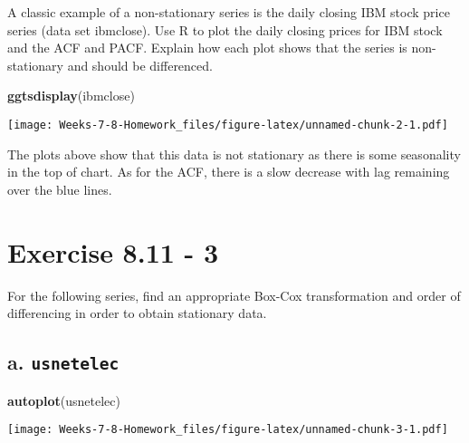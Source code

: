 \documentclass[]{article}
\newenvironment{Shaded}{\begin{snugshade}}{\end{snugshade}}
\newcommand{\KeywordTok}[1]{\textcolor[rgb]{0.13,0.29,0.53}{\textbf{#1}}}
\newcommand{\NormalTok}[1]{#1}
\newcommand{\OperatorTok}[1]{\textcolor[rgb]{0.81,0.36,0.00}{\textbf{#1}}}
\newcommand{\StringTok}[1]{\textcolor[rgb]{0.31,0.60,0.02}{#1}}
\begin{document}
A classic example of a non-stationary series is the daily closing IBM
stock price series (data set ibmclose). Use R to plot the daily closing
prices for IBM stock and the ACF and PACF. Explain how each plot shows
that the series is non-stationary and should be differenced.

\begin{Shaded}
\begin{Highlighting}[]
\KeywordTok{ggtsdisplay}\NormalTok{(ibmclose)}
\end{Highlighting}
\end{Shaded}

\texttt{[image: Weeks-7-8-Homework\_files/figure-latex/unnamed-chunk-2-1.pdf]}

The plots above show that this data is not stationary as there is some
seasonality in the top of chart. As for the ACF, there is a slow
decrease with lag remaining over the blue lines.

\newpage

\hypertarget{exercise-8.11---3}{%
\section{Exercise 8.11 - 3}\label{exercise-8.11---3}}

For the following series, find an appropriate Box-Cox transformation and
order of differencing in order to obtain stationary data.

\hypertarget{a.-usnetelec}{%
\subsection{\texorpdfstring{a.
\texttt{usnetelec}}{a. usnetelec}}\label{a.-usnetelec}}

\begin{Shaded}
\begin{Highlighting}[]
\KeywordTok{autoplot}\NormalTok{(usnetelec)}
\end{Highlighting}
\end{Shaded}

\texttt{[image: Weeks-7-8-Homework\_files/figure-latex/unnamed-chunk-3-1.pdf]}

\begin{Shaded}
\end{Shaded}
\end{document}
